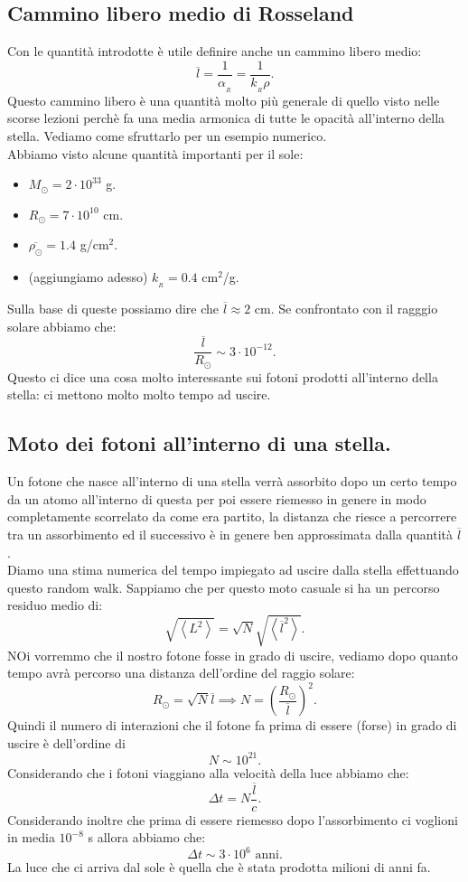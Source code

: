 \subsection{Cammino libero medio di Rosseland}
\label{subsec:Cammino libero medio di Rosseland}
Con le quantità introdotte è utile definire anche un cammino libero medio:
\[
	\overline{l} = \frac{1}{\alpha_{_R}}=\frac{1}{k_{_R}\rho}
.\] 
Questo cammino libero è una quantità molto più generale di quello visto nelle scorse lezioni perchè fa una media armonica di tutte le opacità all'interno della stella. Vediamo come sfruttarlo per un esempio numerico.\\
Abbiamo visto alcune quantità importanti per il sole:
\begin{itemize}
	\item $M_{\odot} = 2 \cdot 10^{33}$ g.
	\item $R_{\odot}=7\cdot 10^{10}$ cm.
	\item $\overline{\rho_{\odot}}=1.4$ g/cm$^2$.
	\item (aggiungiamo adesso) $k_{_R} = 0.4$ cm$^2$/g.
\end{itemize}
Sulla base di queste possiamo dire che $\overline{l} \approx 2$ cm. Se confrontato con il ragggio solare abbiamo che:
\[
	\frac{\overline{l}}{R_{\odot}}\sim 3\cdot 10^{-12}
.\] 
Questo ci dice una cosa molto interessante sui fotoni prodotti all'interno della stella: ci mettono molto molto tempo ad uscire.
\subsection{Moto dei fotoni all'interno di una stella.}
\label{subsec:Moto dei fotoni all'interno di una stella.}
Un fotone che nasce all'interno di una stella verrà assorbito dopo un certo tempo da un atomo all'interno di questa per poi essere riemesso in genere in modo completamente scorrelato da come era partito, la distanza che riesce a percorrere tra un assorbimento ed il successivo è in genere ben approssimata dalla quantità $ \overline{l}$.\\
Diamo una stima numerica del tempo impiegato ad uscire dalla stella effettuando questo random walk. Sappiamo che per questo moto casuale si ha un percorso residuo medio di:
\[
	\sqrt{\left<L^2 \right>} 
	=
	\sqrt{N} \sqrt{\left<\overline{l}^2\right>} 
.\] 
NOi vorremmo che il nostro fotone fosse in grado di uscire, vediamo dopo quanto tempo avrà percorso una distanza dell'ordine del raggio solare:
\[
	R_{\odot} = \sqrt{N} \overline{l} 
	\implies
	N = \left( \frac{R_{\odot}}{\overline{l}} \right)^2
.\] 
Quindi il numero di interazioni che il fotone fa prima di essere (forse) in grado di uscire è dell'ordine di 
\[
	N\sim 10^{21}
.\] 
Considerando che i fotoni viaggiano alla velocità della luce abbiamo che:
\[
	\Delta t=N\frac{\overline{l}}{c} 
.\] 
Considerando inoltre che prima di essere riemesso dopo l'assorbimento ci voglioni in media $10^{-8}$ s allora abbiamo che:
\[
	\Delta t \sim 3\cdot 10^{6} \text{ anni}
.\] 
La luce che ci arriva dal sole è quella che è stata prodotta milioni di anni fa.
